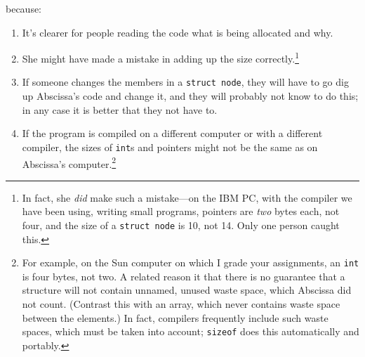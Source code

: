 \begin{flushleft}
\verb% newnode = malloc(sizeof(struct node)); %
\end{flushleft}

\noindent because:

\begin{enumerate}
\item It's clearer for people reading the code what is being allocated
and why.
\item She might have made a mistake in adding up the size
correctly.\footnote{In fact, she {\em did}\/ make such a mistake---on
the IBM PC, with the compiler we have been using, writing small
programs, pointers are {\em two}\/ bytes each, not four, and the size of
a {\tt struct node}  is 10, not 14.  Only one person caught this.}
\item If someone changes the members in a {\tt struct node}, they will
have to go dig up Abscissa's code and change it, and they will probably
not know to do this; in any case it is better that they not have to.
\item If the program is compiled on a different computer or with a
different compiler, the sizes of {\tt int}s and pointers might not be
the same as on Abscissa's computer.\footnote{For example, on the Sun
computer on which I grade your assignments, an {\tt int} is four bytes,
not two.  A related reason it that there is no guarantee that a
structure will not contain unnamed, unused waste space, which Abscissa
did not count.  (Contrast this with an array, which never contains waste
space between the elements.)  In fact, compilers frequently include such
waste spaces, which must be taken into account; {\tt sizeof} does this
automatically and portably.}
% 
\end{enumerate}


